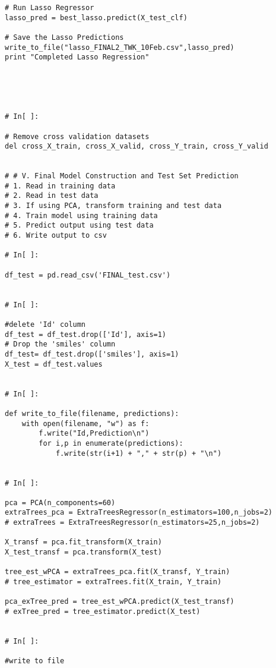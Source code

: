\documentclass[11pt, oneside]{article}   	%
\begin{document}
\begin{lstlisting}
# Run Lasso Regressor
lasso_pred = best_lasso.predict(X_test_clf)

# Save the Lasso Predictions
write_to_file("lasso_FINAL2_TWK_10Feb.csv",lasso_pred)
print "Completed Lasso Regression"





# In[ ]:

# Remove cross validation datasets
del cross_X_train, cross_X_valid, cross_Y_train, cross_Y_valid


# # V. Final Model Construction and Test Set Prediction 
# 1. Read in training data
# 2. Read in test data
# 3. If using PCA, transform training and test data
# 4. Train model using training data
# 5. Predict output using test data
# 6. Write output to csv

# In[ ]:

df_test = pd.read_csv('FINAL_test.csv')


# In[ ]:

#delete 'Id' column
df_test = df_test.drop(['Id'], axis=1)
# Drop the 'smiles' column
df_test= df_test.drop(['smiles'], axis=1)
X_test = df_test.values


# In[ ]:

def write_to_file(filename, predictions):
    with open(filename, "w") as f:
        f.write("Id,Prediction\n")
        for i,p in enumerate(predictions):
            f.write(str(i+1) + "," + str(p) + "\n")


# In[ ]:

pca = PCA(n_components=60)
extraTrees_pca = ExtraTreesRegressor(n_estimators=100,n_jobs=2)
# extraTrees = ExtraTreesRegressor(n_estimators=25,n_jobs=2)

X_transf = pca.fit_transform(X_train)
X_test_transf = pca.transform(X_test)

tree_est_wPCA = extraTrees_pca.fit(X_transf, Y_train)
# tree_estimator = extraTrees.fit(X_train, Y_train)

pca_exTree_pred = tree_est_wPCA.predict(X_test_transf)
# exTree_pred = tree_estimator.predict(X_test)


# In[ ]:

#write to file


\end{lstlisting}
 
\end{document}
